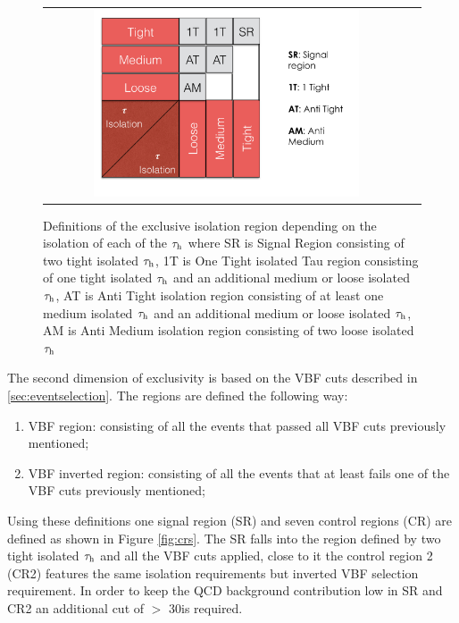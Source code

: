  	\begin{figure}[tbh!]
 		\centering
 		\begin{tabular}{cc}
 			\includegraphics[width=0.75\textwidth]{PLOTS/diTauHadLSotherPlots/tauisoregions.png}
 		\end{tabular}
 		\caption{Definitions of the exclusive isolation region depending on the isolation of each of the $\tau_{\text{h}}$ where SR is Signal Region consisting of two tight isolated $\tau_{\text{h}}$, 1T is One Tight isolated Tau region consisting of one tight isolated $\tau_{\text{h}}$ and an additional medium or loose isolated $\tau_{\text{h}}$, AT is Anti Tight isolation region consisting of at least one medium isolated $\tau_{\text{h}}$ and an additional medium or loose isolated $\tau_{\text{h}}$,  AM is Anti Medium isolation region consisting of two loose isolated $\tau_{\text{h}}$}
 		\label{fig:tauisoregions}
 	\end{figure}
 
The second dimension of exclusivity is based on the VBF cuts described in \ref{sec:eventselection}. The regions are defined the following way:
	
	\begin{enumerate}
		\item VBF region: consisting of all the events that passed all VBF cuts previously mentioned;
		\item VBF inverted region: consisting of all the events that at least fails one of the VBF cuts previously mentioned;
	\end{enumerate} 

Using these definitions one signal region (SR) and seven control regions (CR) are defined as shown in Figure \ref{fig:crs}. The SR falls into the region defined by two tight isolated $\tau_{\text{h}}$ and all the VBF cuts applied, close to it the control region 2 (CR2) features the same \hadtau isolation requirements but inverted VBF selection requirement. In order to keep the QCD background contribution low in SR and CR2 an additional cut of  \met $ > $ 30\gev is required.


